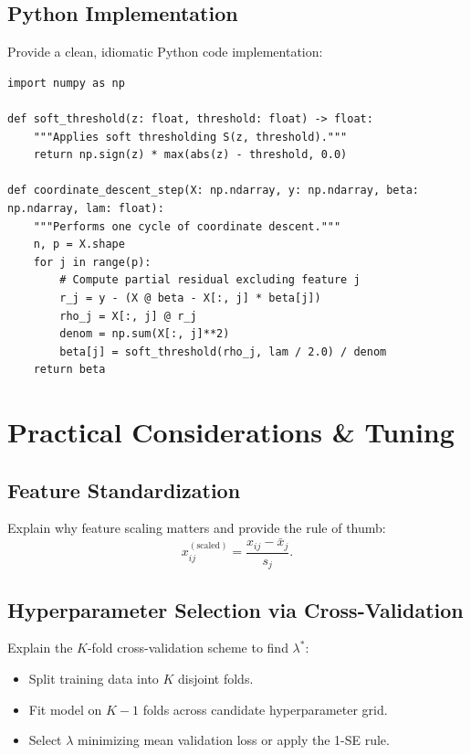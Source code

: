 \documentclass[11pt,a4paper,oneside]{book}
\begin{document}
\section{Python Implementation}
Provide a clean, idiomatic Python code implementation:

\begin{lstlisting}
import numpy as np

def soft_threshold(z: float, threshold: float) -> float:
    """Applies soft thresholding S(z, threshold)."""
    return np.sign(z) * max(abs(z) - threshold, 0.0)

def coordinate_descent_step(X: np.ndarray, y: np.ndarray, beta: np.ndarray, lam: float):
    """Performs one cycle of coordinate descent."""
    n, p = X.shape
    for j in range(p):
        # Compute partial residual excluding feature j
        r_j = y - (X @ beta - X[:, j] * beta[j])
        rho_j = X[:, j] @ r_j
        denom = np.sum(X[:, j]**2)
        beta[j] = soft_threshold(rho_j, lam / 2.0) / denom
    return beta
\end{lstlisting}


\chapter{Practical Considerations \& Tuning}

\section{Feature Standardization}
Explain why feature scaling matters and provide the rule of thumb:
\begin{equation}
  x_{ij}^{(\text{scaled})} = \frac{x_{ij} - \bar{x}_j}{s_j}.
\end{equation}

\section{Hyperparameter Selection via Cross-Validation}
Explain the $K$-fold cross-validation scheme to find $\lambda^*$:
\begin{itemize}
  \item Split training data into $K$ disjoint folds.
  \item Fit model on $K-1$ folds across candidate hyperparameter grid.
  \item Select $\lambda$ minimizing mean validation loss or apply the 1-SE rule.
\end{itemize}
\end{document}
